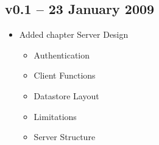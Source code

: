 \subsection*{v0.1 -- 23 January 2009}
\begin{itemize}
  \item Added chapter Server Design
\begin{itemize}
  \item Authentication
  \item Client Functions
  \item Datastore Layout
  \item Limitations
  \item Server Structure
\end{itemize}
\end{itemize}